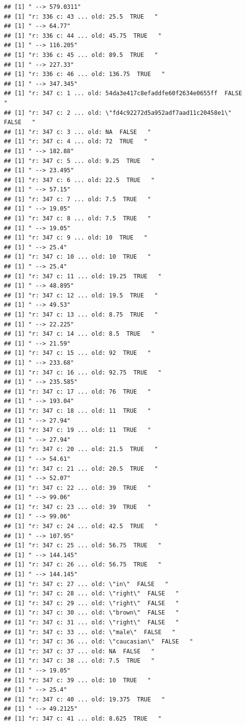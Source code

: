 \documentclass[]{article}
\begin{document}
\begin{verbatim}
## [1] " --> 579.0311"
## [1] "r: 336 c: 43 ... old: 25.5  TRUE   "
## [1] " --> 64.77"
## [1] "r: 336 c: 44 ... old: 45.75  TRUE   "
## [1] " --> 116.205"
## [1] "r: 336 c: 45 ... old: 89.5  TRUE   "
## [1] " --> 227.33"
## [1] "r: 336 c: 46 ... old: 136.75  TRUE   "
## [1] " --> 347.345"
## [1] "r: 347 c: 1 ... old: 54da3e417c8efaddfe60f2634e0655ff  FALSE   "
## [1] "r: 347 c: 2 ... old: \"fd4c92272d5a952adf7aad11c20458e1\"  FALSE   "
## [1] "r: 347 c: 3 ... old: NA  FALSE   "
## [1] "r: 347 c: 4 ... old: 72  TRUE   "
## [1] " --> 182.88"
## [1] "r: 347 c: 5 ... old: 9.25  TRUE   "
## [1] " --> 23.495"
## [1] "r: 347 c: 6 ... old: 22.5  TRUE   "
## [1] " --> 57.15"
## [1] "r: 347 c: 7 ... old: 7.5  TRUE   "
## [1] " --> 19.05"
## [1] "r: 347 c: 8 ... old: 7.5  TRUE   "
## [1] " --> 19.05"
## [1] "r: 347 c: 9 ... old: 10  TRUE   "
## [1] " --> 25.4"
## [1] "r: 347 c: 10 ... old: 10  TRUE   "
## [1] " --> 25.4"
## [1] "r: 347 c: 11 ... old: 19.25  TRUE   "
## [1] " --> 48.895"
## [1] "r: 347 c: 12 ... old: 19.5  TRUE   "
## [1] " --> 49.53"
## [1] "r: 347 c: 13 ... old: 8.75  TRUE   "
## [1] " --> 22.225"
## [1] "r: 347 c: 14 ... old: 8.5  TRUE   "
## [1] " --> 21.59"
## [1] "r: 347 c: 15 ... old: 92  TRUE   "
## [1] " --> 233.68"
## [1] "r: 347 c: 16 ... old: 92.75  TRUE   "
## [1] " --> 235.585"
## [1] "r: 347 c: 17 ... old: 76  TRUE   "
## [1] " --> 193.04"
## [1] "r: 347 c: 18 ... old: 11  TRUE   "
## [1] " --> 27.94"
## [1] "r: 347 c: 19 ... old: 11  TRUE   "
## [1] " --> 27.94"
## [1] "r: 347 c: 20 ... old: 21.5  TRUE   "
## [1] " --> 54.61"
## [1] "r: 347 c: 21 ... old: 20.5  TRUE   "
## [1] " --> 52.07"
## [1] "r: 347 c: 22 ... old: 39  TRUE   "
## [1] " --> 99.06"
## [1] "r: 347 c: 23 ... old: 39  TRUE   "
## [1] " --> 99.06"
## [1] "r: 347 c: 24 ... old: 42.5  TRUE   "
## [1] " --> 107.95"
## [1] "r: 347 c: 25 ... old: 56.75  TRUE   "
## [1] " --> 144.145"
## [1] "r: 347 c: 26 ... old: 56.75  TRUE   "
## [1] " --> 144.145"
## [1] "r: 347 c: 27 ... old: \"in\"  FALSE   "
## [1] "r: 347 c: 28 ... old: \"right\"  FALSE   "
## [1] "r: 347 c: 29 ... old: \"right\"  FALSE   "
## [1] "r: 347 c: 30 ... old: \"brown\"  FALSE   "
## [1] "r: 347 c: 31 ... old: \"right\"  FALSE   "
## [1] "r: 347 c: 33 ... old: \"male\"  FALSE   "
## [1] "r: 347 c: 36 ... old: \"caucasian\"  FALSE   "
## [1] "r: 347 c: 37 ... old: NA  FALSE   "
## [1] "r: 347 c: 38 ... old: 7.5  TRUE   "
## [1] " --> 19.05"
## [1] "r: 347 c: 39 ... old: 10  TRUE   "
## [1] " --> 25.4"
## [1] "r: 347 c: 40 ... old: 19.375  TRUE   "
## [1] " --> 49.2125"
## [1] "r: 347 c: 41 ... old: 8.625  TRUE   "

\end{verbatim}
\end{document}
